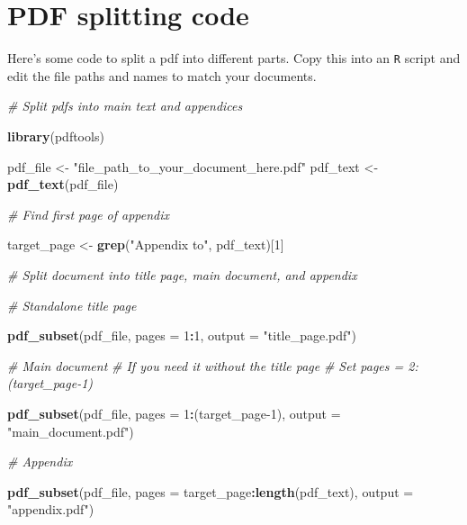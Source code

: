 \documentclass[
  a4paper,
  twoside]{article}
\newenvironment{Shaded}{\begin{snugshade}}{\end{snugshade}}
\newcommand{\AttributeTok}[1]{\textcolor[rgb]{0.13,0.29,0.53}{#1}}
\newcommand{\CommentTok}[1]{\textcolor[rgb]{0.56,0.35,0.01}{\textit{#1}}}
\newcommand{\DecValTok}[1]{\textcolor[rgb]{0.00,0.00,0.81}{#1}}
\newcommand{\FunctionTok}[1]{\textcolor[rgb]{0.13,0.29,0.53}{\textbf{#1}}}
\newcommand{\NormalTok}[1]{#1}
\newcommand{\OtherTok}[1]{\textcolor[rgb]{0.56,0.35,0.01}{#1}}
\newcommand{\SpecialCharTok}[1]{\textcolor[rgb]{0.81,0.36,0.00}{\textbf{#1}}}
\newcommand{\StringTok}[1]{\textcolor[rgb]{0.31,0.60,0.02}{#1}}
\begin{document}
\newpage

\section{PDF splitting code}\label{appendixPDFsplit}

Here's some code to split a pdf into different parts. Copy this into an \texttt{R} script and edit the file paths and names to match your documents.

\begin{Shaded}
\begin{Highlighting}[]
\CommentTok{\# Split pdfs into main text and appendices}

\FunctionTok{library}\NormalTok{(pdftools)}

\NormalTok{pdf\_file }\OtherTok{\textless{}{-}} \StringTok{"file\_path\_to\_your\_document\_here.pdf"}
\NormalTok{pdf\_text }\OtherTok{\textless{}{-}} \FunctionTok{pdf\_text}\NormalTok{(pdf\_file)}

\CommentTok{\# Find first page of appendix}

\NormalTok{target\_page }\OtherTok{\textless{}{-}} \FunctionTok{grep}\NormalTok{(}\StringTok{"Appendix to"}\NormalTok{, pdf\_text)[}\DecValTok{1}\NormalTok{]}

\CommentTok{\# Split document into title page, main document, and appendix}

\CommentTok{\# Standalone title page}

\FunctionTok{pdf\_subset}\NormalTok{(pdf\_file,}
           \AttributeTok{pages =} \DecValTok{1}\SpecialCharTok{:}\DecValTok{1}\NormalTok{, }
           \AttributeTok{output =} \StringTok{"title\_page.pdf"}\NormalTok{)}

\CommentTok{\# Main document}
\CommentTok{\# If you need it without the title page}
\CommentTok{\# Set \textasciigrave{}pages = 2:(target\_page{-}1)\textasciigrave{}}

\FunctionTok{pdf\_subset}\NormalTok{(pdf\_file,}
           \AttributeTok{pages =} \DecValTok{1}\SpecialCharTok{:}\NormalTok{(target\_page}\DecValTok{{-}1}\NormalTok{), }
           \AttributeTok{output =} \StringTok{"main\_document.pdf"}\NormalTok{)}

\CommentTok{\# Appendix}

\FunctionTok{pdf\_subset}\NormalTok{(pdf\_file,}
           \AttributeTok{pages =}\NormalTok{ target\_page}\SpecialCharTok{:}\FunctionTok{length}\NormalTok{(pdf\_text), }
           \AttributeTok{output =} \StringTok{"appendix.pdf"}\NormalTok{)}
\end{Highlighting}
\end{Shaded}
\end{document}
